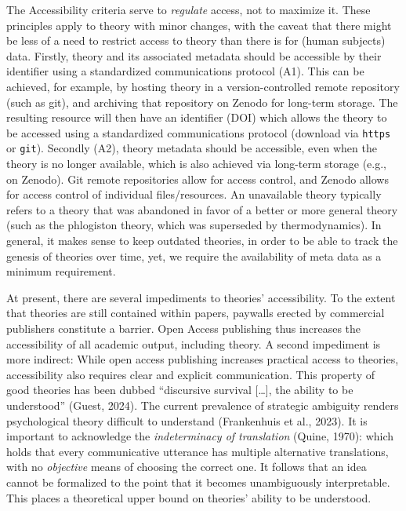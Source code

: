 \documentclass[
  man,floatsintext]{apa6}
\begin{document}
The Accessibility criteria serve to \emph{regulate} access, not to maximize it.
These principles apply to theory with minor changes, with the caveat that there might be less of a need to restrict access to theory than there is for (human subjects) data.
Firstly, theory and its associated metadata should be accessible by their identifier using a standardized communications protocol (A1).
This can be achieved, for example, by hosting theory in a version-controlled remote repository (such as git), and archiving that repository on Zenodo for long-term storage.
The resulting resource will then have an identifier (DOI) which allows the theory to be accessed using a standardized communications protocol (download via \texttt{https} or \texttt{git}).
Secondly (A2), theory metadata should be accessible, even when the theory is no longer available,
which is also achieved via long-term storage (e.g., on Zenodo).
Git remote repositories allow for access control,
and Zenodo allows for access control of individual files/resources.
An unavailable theory typically refers to a theory that was abandoned in favor of a better or more general theory (such as the phlogiston theory, which was superseded by thermodynamics).
In general, it makes sense to keep outdated theories, in order to be able to track the genesis of theories over time, yet, we require the availability of meta data as a minimum requirement.

At present, there are several impediments to theories' accessibility.
To the extent that theories are still contained within papers,
paywalls erected by commercial publishers constitute a barrier.
Open Access publishing thus increases the accessibility of all academic output, including theory.
A second impediment is more indirect:
While open access publishing increases practical access to theories,
accessibility also requires clear and explicit communication.
This property of good theories has been dubbed ``discursive survival {[}\ldots{]}, the ability to be understood'' (Guest, 2024).
The current prevalence of strategic ambiguity renders psychological theory difficult to understand (Frankenhuis et al., 2023).
It is important to acknowledge the \emph{indeterminacy of translation} (Quine, 1970):
which holds that every communicative utterance has multiple alternative translations, with no \emph{objective} means of choosing the correct one.
It follows that an idea cannot be formalized to the point that it becomes unambiguously interpretable.
This places a theoretical upper bound on theories' ability to be understood.
\end{document}
